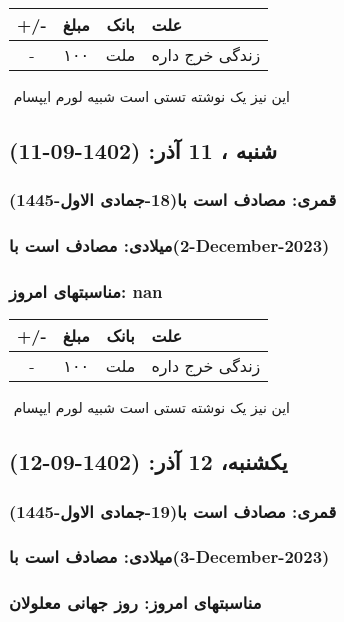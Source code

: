 \documentclass{article}
\newcommand{\rnote}[1]{\marginpar{\textcolor{color}{\StrSubstitute{\##1}{ }{\_}}}}
\newcommand{\myRow}[4]{
    #1 & #2 & #3 & #4 \\ \hline
}
\begin{document}
\begin{tabular}{ | c | c | c | p{5cm} |}
    \hline
    \myRow{ +/- }{مبلغ}{بانک}{علت}
    \myRow{-}{۱۰۰}{ملت}{زندگی خرج داره}
\end{tabular}
\newline
\newline

‌
\rnote{تست}
این نیز یک نوشته تستی است شبیه لورم ایپسام




\newpage
{}
\textcolor{color}{
\section{ شنبه ، 11 آذر: (1402-09-11) }
\subsubsection*{قمری: مصادف است با(18-جمادی الاول-1445)} 
\subsubsection*{میلادی: مصادف است با(2-December-2023)}
\subsubsection*{مناسبتهای امروز: nan}
}


\begin{tabular}{ | c | c | c | p{5cm} |}
    \hline
    \myRow{ +/- }{مبلغ}{بانک}{علت}
    \myRow{-}{۱۰۰}{ملت}{زندگی خرج داره}
\end{tabular}
\newline
\newline

‌
\rnote{تست}
این نیز یک نوشته تستی است شبیه لورم ایپسام




\newpage
{}
\textcolor{color}{
\section{ یکشنبه، 12 آذر: (1402-09-12) }
\subsubsection*{قمری: مصادف است با(19-جمادی الاول-1445)} 
\subsubsection*{میلادی: مصادف است با(3-December-2023)}
\subsubsection*{مناسبتهای امروز: روز جهانی معلولان}
}
\end{document}
